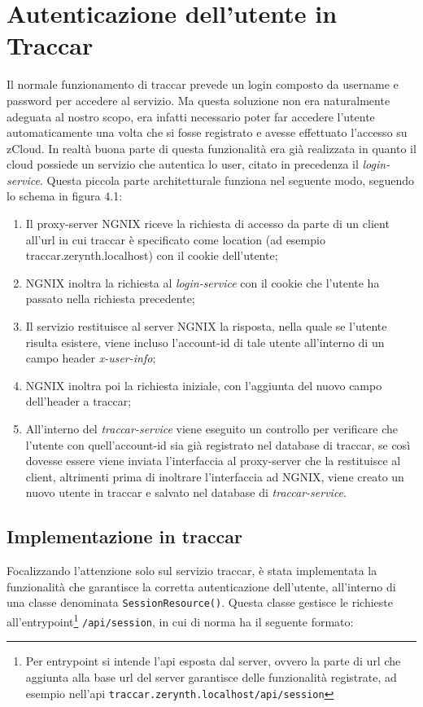\documentclass[a4paper,titlepage,12pt]{book}
\begin{document}
{\section{
Autenticazione dell'utente in Traccar}
Il normale funzionamento di traccar prevede un login composto da username e password per accedere al servizio. Ma questa soluzione non era naturalmente adeguata al nostro scopo, era infatti necessario poter far accedere l'utente automaticamente una volta che si fosse registrato e avesse effettuato l'accesso su zCloud. In realtà buona parte di questa funzionalità era già realizzata in quanto il cloud possiede un servizio che autentica lo user, citato in precedenza il \textit{login-service}. Questa piccola parte architetturale funziona nel seguente modo, seguendo lo schema in figura 4.1:\\
\begin{enumerate}
\item Il proxy-server NGNIX riceve la richiesta di accesso da parte di un client all'url in cui traccar è specificato come location (ad esempio traccar.zerynth.localhost) con il cookie dell'utente;
\item NGNIX inoltra la richiesta al \textit{login-service} con il cookie che l'utente ha passato nella richiesta precedente;
\item Il servizio restituisce al server NGNIX la risposta, nella quale se l'utente risulta esistere, viene incluso l'account-id di tale utente all'interno di un campo header \textit{x-user-info};
\item NGNIX inoltra poi la richiesta iniziale, con l'aggiunta del nuovo campo dell'header a traccar;

\item All'interno del \textit{traccar-service} viene eseguito un controllo per verificare che l'utente con quell'account-id sia già registrato nel database di traccar, se così dovesse essere viene inviata l'interfaccia al proxy-server che la restituisce al client, altrimenti prima di inoltrare l'interfaccia ad NGNIX, viene creato un nuovo utente in traccar e salvato nel database di \textit{traccar-service}.
\end{enumerate}


\subsection{Implementazione in traccar}
Focalizzando l'attenzione solo sul servizio traccar, è stata implementata la funzionalità che garantisce la corretta autenticazione dell'utente, all'interno di una classe denominata \texttt{SessionResource()}. Questa classe gestisce le richieste all'entrypoint\footnote{Per entrypoint si intende l'api esposta dal server, ovvero la parte di url che aggiunta alla base url del server garantisce delle funzionalità registrate, ad esempio nell'api \texttt{traccar.zerynth.localhost/api/session}} \texttt{/api/session}, in cui di norma ha il seguente formato:\par\medskip

}
\end{document}

